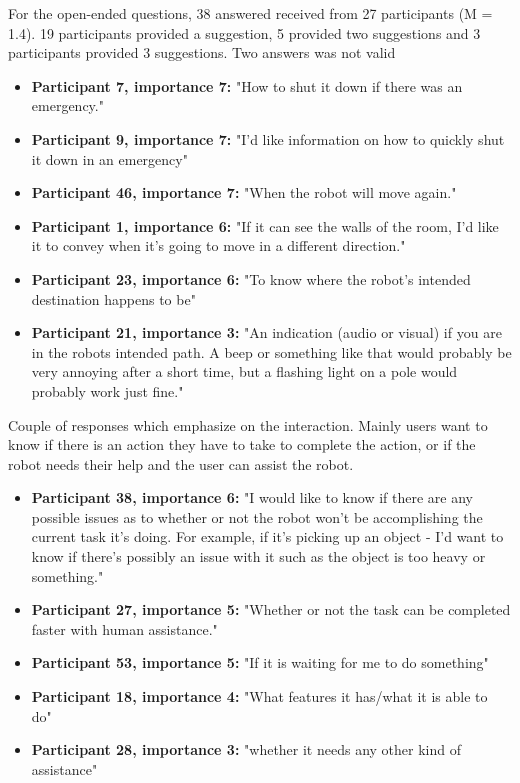 \documentclass[letterpaper, 10 pt, conference]{ieeeconf}  %
\begin{document}
For the open-ended questions, 38 answered received from 27 participants (M = 1.4). 19 participants provided a suggestion, 5 provided two suggestions and 3 participants provided 3 suggestions. Two answers was not valid  
\begin{itemize}
    \item  \textbf{Participant 7, importance 7:} "How to shut it down if there was an emergency."
    \item  \textbf{Participant 9, importance 7:} "I'd like information on how to quickly shut it down in an emergency"
    \item  \textbf{Participant 46, importance 7:} "When the robot will move again."
    \item  \textbf{Participant 1, importance 6:} "If it can see the walls of the room, I'd like it to convey when it's going to move in a different direction."
    \item  \textbf{Participant 23, importance 6:} "To know where the robot's intended destination happens to be"
    \item  \textbf{Participant 21, importance 3:} "An indication (audio or visual) if you are in the robots intended path. A beep or something like that would probably be very annoying after a short time, but a flashing light on a pole would probably work just fine."
\end{itemize}

Couple of responses which emphasize on the interaction. Mainly users want to know if there is an action they have to take to complete the action, or if the robot needs their help and the user can assist the robot.

\begin{itemize}
    \item  \textbf{Participant 38, importance 6:} "I would like to know if there are any possible issues as to whether or not the robot won't be accomplishing the current task it's doing.  For example, if it's picking up an object - I'd want to know if there's possibly an issue with it such as the object is too heavy or something."
    \item  \textbf{Participant 27, importance 5:} "Whether or not the task can be completed faster with human assistance."
    \item  \textbf{Participant 53, importance 5:} "If it is waiting for me to do something"
    \item  \textbf{Participant 18, importance 4:} "What features it has/what it is able to do"
    \item  \textbf{Participant 28, importance 3:} "whether it needs any other kind of assistance"
\end{itemize}
\end{document}
